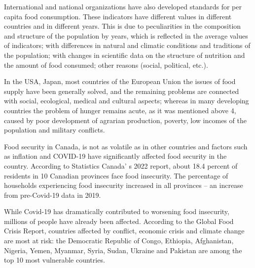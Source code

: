 {%
% 
% 

International and national organizations have also developed standards
for per capita food consumption. These indicators have different values
in different countries and in different years. This is due to
peculiarities in the composition and structure of the population by
years, which is reflected in the average values of indicators; with
differences in natural and climatic conditions and traditions of the
population; with changes in scientific data on the structure of
nutrition and the amount of food consumed; other reasons (social,
political, etc.).

In the USA, Japan, most countries of the European Union the issues of
food supply have been generally solved, and the remaining problems are
connected with social, ecological, medical and cultural aspects; whereas
in many developing countries the problem of hunger remains acute, as it
was mentioned above 4, caused by poor development of agrarian
production, poverty, low incomes of the population and military
conflicts.

Food security in Canada, is not as volatile as in other countries and
factors such as inflation and COVID-19 have significantly affected food
security in the country. According to Statistics
Canada' s 2022 report, about 18.4 percent of residents in
10 Canadian provinces face food insecurity. The percentage of households
experiencing food insecurity increased in all provinces -- an increase
from pre-Covid-19 data in 2019.

While Covid-19 has dramatically contributed to worsening food
insecurity, millions of people have already been affected. According to
the Global Food Crisis Report, countries affected by conflict, economic
crisis and climate change are most at risk: the Democratic Republic of
Congo, Ethiopia, Afghanistan, Nigeria, Yemen, Myanmar, Syria, Sudan,
Ukraine and Pakistan are among the top 10 most vulnerable countries.

}
